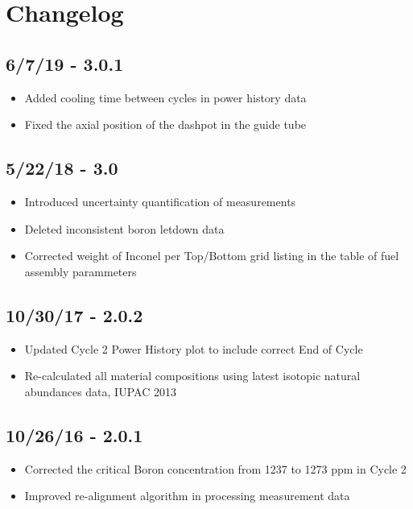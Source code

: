 \section*{Changelog}

\subsection*{6/7/19 - 3.0.1}
\begin{itemize}
  \item Added cooling time between cycles in power history data
  \item Fixed the axial position of the dashpot in the guide tube
\end{itemize}

\subsection*{5/22/18 - 3.0}
\begin{itemize}
  \item Introduced uncertainty quantification of measurements
  \item Deleted inconsistent boron letdown data
  \item Corrected weight of Inconel per Top/Bottom grid listing in the table of
        fuel assembly parammeters
\end{itemize}

\subsection*{10/30/17 - 2.0.2}
\begin{itemize}
  \item Updated Cycle 2 Power History plot to include correct End of Cycle
  \item Re-calculated all material compositions using latest isotopic natural
        abundances data, IUPAC 2013
\end{itemize}

\subsection*{10/26/16 - 2.0.1}
\begin{itemize}
  \item Corrected the critical Boron concentration from 1237 to 1273 ppm in Cycle 2
  \item Improved re-alignment algorithm in processing measurement data
\end{itemize}

